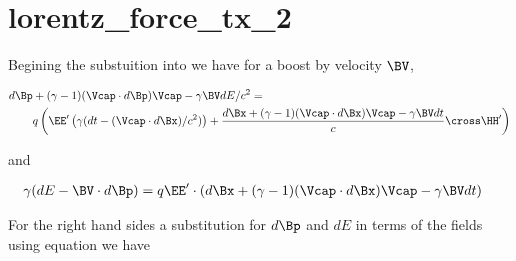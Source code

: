 %
%
%
%
%
%
%
%
\chapter{lorentz_force_tx_2}

Begining the substuition into  we have for a boost by velocity \(\BV\), 

\begin{equation}\label{eqn:lorentz_force_tx_2:20}
\begin{aligned}
d\Bp &+ (\gamma-1)(\Vcap \cdot d\Bp) \Vcap - \gamma \BV dE/c^2 = \\
&q \left( \EE' \left(\gamma ( dt - (\Vcap \cdot d\Bx )/c^2 )\right) + \frac{d\Bx + (\gamma-1)(\Vcap \cdot d\Bx) \Vcap - \gamma \BV dt}{c} \cross \HH' \right)  \\
\end{aligned}
\end{equation}

and

\begin{equation}\label{eqn:lorentz_force_tx_2:40}
\begin{aligned}
\gamma ( dE - \BV \cdot d\Bp ) &= q \EE' \cdot \left(d\Bx + (\gamma-1)(\Vcap \cdot d\Bx) \Vcap - \gamma \BV dt\right)
\end{aligned}
\end{equation}

For the right hand sides a substitution for \(d\Bp\) and \(dE\) in terms of the fields using equation
 we have


